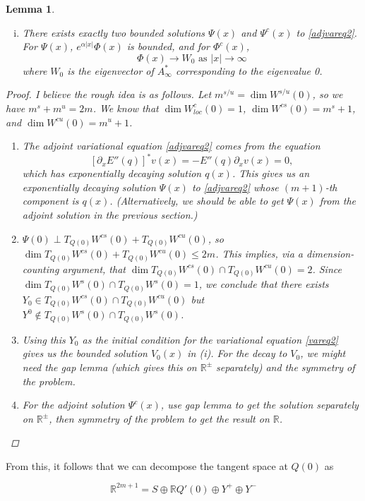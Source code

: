 \documentclass[12pt]{article}
\def\R{{\mathbb R}}
\newtheorem{lemma}{Lemma}
\begin{document}
\begin{lemma}
\begin{enumerate}[(i)]
\item There exists exactly two bounded solutions $\Psi(x)$ and $\Psi^c(x)$ to \eqref{adjvareq2}. For $\Psi(x)$, $e^{\alpha |x|}\Phi(x)$ is bounded, and for $\Phi^c(x)$,
\begin{equation}
\Phi(x) \rightarrow W_0 \text{ as }|x| \rightarrow \infty
\end{equation}
where $W_0$ is the eigenvector of $A_\infty^*$ corresponding to the eigenvalue 0.
\end{enumerate}
\begin{proof}
I believe the rough idea is as follows. Let $m^{s/u} = \dim W^{s/u}(0)$, so we have $m^s + m^u = 2m$. We know that $\dim W^c_{loc}(0) = 1$, $\dim W^{cs}(0) = m^s + 1$, and $\dim W^{cu}(0) = m^u + 1$.
\begin{enumerate}
\item The adjoint variational equation \eqref{adjvareq2} comes from the equation 
\[
[\partial_x E''(q) ]^* v(x) = -E''(q) \partial_x v(x) = 0,
\]
which has exponentially decaying solution $q(x)$. This gives us an exponentially decaying solution $\Psi(x)$ to \eqref{adjvareq2} whose $(m+1)$-th component is $q(x)$. (Alternatively, we should be able to get $\Psi(x)$ from the adjoint solution in the previous section.)
\item $\Psi(0) \perp T_{Q(0)}W^{cs}(0) + T_{Q(0)}W^{cu}(0)$, so $\dim T_{Q(0)}W^{cs}(0) + T_{Q(0)}W^{cu}(0) \leq 2m$. This implies, via a dimension-counting argument, that $\dim T_{Q(0)}W^{cs}(0) \cap T_{Q(0)}W^{cu}(0) = 2$. Since $\dim T_{Q(0)}W^s(0) \cap T_{Q(0)}W^s(0) = 1$, we conclude that there exists $Y_0 \in T_{Q(0)}W^{cs}(0) \cap T_{Q(0)}W^{cu}(0)$ but $Y^0 \notin T_{Q(0)}W^s(0) \cap T_{Q(0)}W^s(0)$.
\item Using this $Y_0$ as the initial condition for the variational equation \eqref{vareq2} gives us the bounded solution $V_0(x)$ in (i). For the decay to $V_0$, we might need the gap lemma (which gives this on $\R^\pm$ separately) and the symmetry of the problem.
\item For the adjoint solution $\Psi^c(x)$, use gap lemma to get the solution separately on $\R^\pm$, then symmetry of the problem to get the result on $\R$.
\end{enumerate}
\end{proof}
\end{lemma}


From this, it follows that we can decompose the tangent space at $Q(0)$ as 

\begin{equation}
\R^{2m+1} = S \oplus \R Q'(0) \oplus Y^+ \oplus Y^-
\end{equation}
\end{document}
